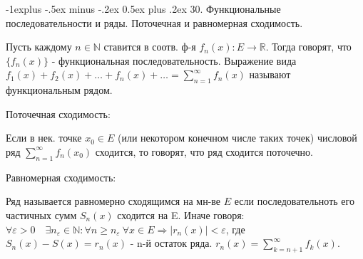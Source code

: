 \documentclass[unicode,10pt, landscape]{article}
\makeatletter
\renewcommand{\subsection}{\@startsection{subsection}{2}{0mm}%
                                {-1explus -.5ex minus -.2ex}%
                                {0.5ex plus .2ex}%
                                {\normalfont\normalsize\bfseries}}
\makeatother
\begin{document}
\begin{multicols}{2}

\subsection{30. Функциональные последовательности и ряды. Поточечная и равномерная сходимость.}
\begin{Def}
Пусть каждому $n \in \mathbb{N}$ ставится в соотв. ф-я $f_n(x): E \to \mathbb{R}$. Тогда говорят, что $\{f_n(x)\}$ - функциональная последовательность.
Выражение вида $f_1(x) + f_2(x) + \ldots + f_n(x) + \ldots = \sum_{n=1}^\infty f_n(x)$ называют функциональным рядом.
\end{Def}
Поточечная сходимость:
\begin{Def}
Если в нек. точке $x_0 \in E$ (или некотором конечном числе таких точек) числовой ряд $\sum_{n=1}^\infty f_n(x_0)$ сходится, то говорят, что ряд сходится поточечно.
\end{Def}
Равномерная сходимость:
\begin{Def}
Ряд называется равномерно сходящимся на мн-ве $E$ если последовательноть его частичных сумм $S_n(x)$ сходится на E. Иначе говоря: $\forall \varepsilon >0 \quad \exists n_{ \varepsilon  }\in \mathbb{N}: \forall n \ge n_\varepsilon \  \forall x \in E  \Rightarrow \left|r_n(x)\right| < \varepsilon$, где $ S_n(x)-S(x)=r_n(x)$ - n-й остаток ряда. $r_n(x) =\sum_{k = n + 1}^\infty f_k(x)$.
\end{Def}



\end{multicols}
\end{document}
